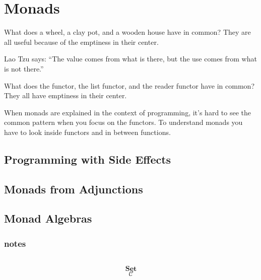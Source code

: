 \documentclass[DaoFP]{subfiles}
\begin{document}
\setcounter{chapter}{12}

\chapter{Monads}

What does a wheel, a clay pot, and a wooden house have in common? They are all useful because of the emptiness in their center. 

Lao Tzu says: ``The value comes from what is there, but the use comes from what is not there.''

What does the  functor, the list functor, and the reader functor have in common? They all have emptiness in their center. 

When monads are explained in the context of programming, it's hard to see the common pattern when you focus on the functors. To understand monads you have to look inside functors and in between functions.

\section{Programming with Side Effects}



\section{Monads from Adjunctions}

\section{Monad Algebras}


\subsection{notes}


\begin{exercise}
\end{exercise}

\begin{haskell}
\end{haskell}

\[
 \begin{tikzcd}
  \end{tikzcd}
\]

\[   \mathbf{Set} \]
\[   \mathcal{C} \]
\end{document}
